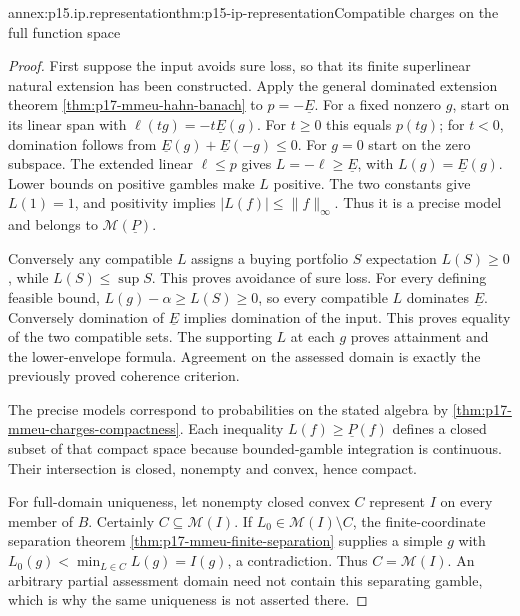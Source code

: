 \begin{annexitem}{annex:p15.ip.representation}{thm:p15-ip-representation}{Compatible charges on the full function space}
\begin{proof}
First suppose the input avoids sure loss, so that its finite superlinear
natural extension has been constructed. Apply the general dominated
extension theorem \cref{thm:p17-mmeu-hahn-banach} to
\(p=-\underline E\). For a fixed nonzero \(g\), start on its linear
span with \(\ell(tg)=-t\underline E(g)\). For \(t\geq0\)
this equals \(p(tg)\); for \(t<0\), domination follows from
\(\underline E(g)+\underline E(-g)\leq0\). For \(g=0\)
start on the zero subspace. The extended linear \(\ell\leq p\)
gives \(L=-\ell\geq\underline E\), with
\(L(g)=\underline E(g)\). Lower bounds on positive gambles make
\(L\) positive. The two constants give \(L(1)=1\), and positivity
implies \(|L(f)|\leq\|f\|_\infty\). Thus it is a precise model
and belongs to \(\mathcal M(\underline P)\).

Conversely any compatible \(L\) assigns a buying portfolio \(S\)
expectation \(L(S)\geq0\), while \(L(S)\leq\sup S\).
This proves avoidance of sure loss. For every defining feasible bound,
\(L(g)-\alpha\geq L(S)\geq0\), so every compatible \(L\)
dominates \(\underline E\). Conversely domination of
\(\underline E\) implies domination of the input. This proves
equality of the two compatible sets. The supporting \(L\) at each
\(g\) proves attainment and the lower-envelope formula. Agreement
on the assessed domain is exactly the previously proved coherence
criterion.

The precise models correspond to probabilities on the stated algebra
by \cref{thm:p17-mmeu-charges-compactness}. Each inequality
\(L(f)\geq\underline P(f)\) defines a closed subset of that compact
space because bounded-gamble integration is continuous. Their intersection
is closed, nonempty and convex, hence compact.

For full-domain uniqueness, let nonempty closed convex \(C\) represent
\(I\) on every member of \(B\). Certainly \(C\subseteq\mathcal M(I)\).
If \(L_0\in\mathcal M(I)\setminus C\), the finite-coordinate
separation theorem \cref{thm:p17-mmeu-finite-separation} supplies a
simple \(g\) with \(L_0(g)<\min_{L\in C}L(g)=I(g)\), a
contradiction. Thus \(C=\mathcal M(I)\). An arbitrary partial
assessment domain need not contain this separating gamble, which is
why the same uniqueness is not asserted there.
\end{proof}
\end{annexitem}

